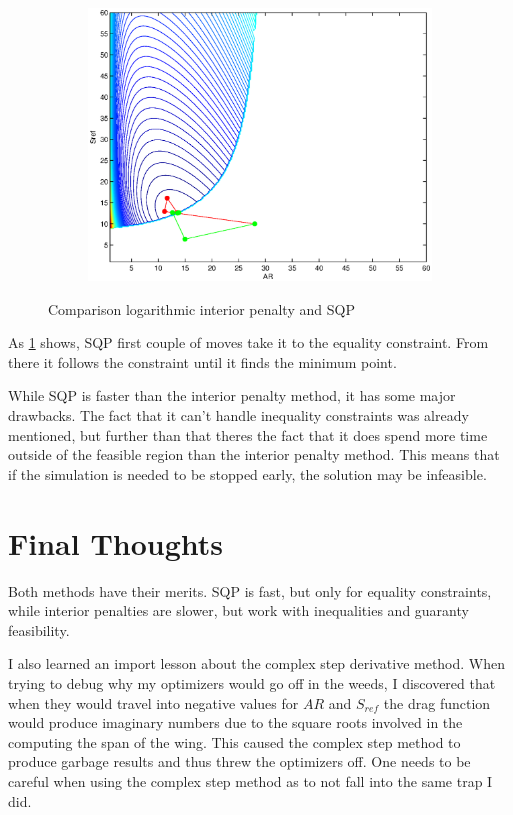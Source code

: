 \documentclass[12pt,parskip=full]{article}
\numberwithin{subsection}{section}
\begin{document}
\begin{figure}[!ht]
\begin{subfigure}[h]{0.45\textwidth}
				\end{subfigure}
				\begin{subfigure}[h]{0.45\textwidth}
					\includegraphics[width=\textwidth]{Opt3.eps}
				\end{subfigure}
				\caption{Comparison logarithmic interior penalty and SQP\label{fig:paths}}
			\end{figure}
			As \cref{fig:paths} shows, SQP first couple of moves take it to the equality constraint. From there
			it follows the constraint until it finds the minimum point.
			
			While SQP is faster than the interior penalty method, it has some major drawbacks. The fact that it
			can't handle inequality constraints was already mentioned, but further than that theres the fact
			that it does spend more time outside of the feasible region than the interior penalty method. This
			means that if the simulation is needed to be stopped early, the solution may be infeasible.
			
	\section{Final Thoughts}
	
		Both methods have their merits. SQP is fast, but only for equality constraints, while interior penalties
		are slower, but work with inequalities and guaranty feasibility.
		
		I also learned an import lesson about the complex step derivative method. When trying to debug why my
		optimizers would go off in the weeds, I discovered that when they would travel into negative values for
		$AR$ and $S_{ref}$ the drag function would produce imaginary numbers due to the square roots involved in
		the computing the span of the wing. This caused the complex step method to produce garbage results and 
		thus threw the optimizers off. One needs to be careful when using the complex step method as to not fall
		into the same trap I did. 
		
\end{document}
